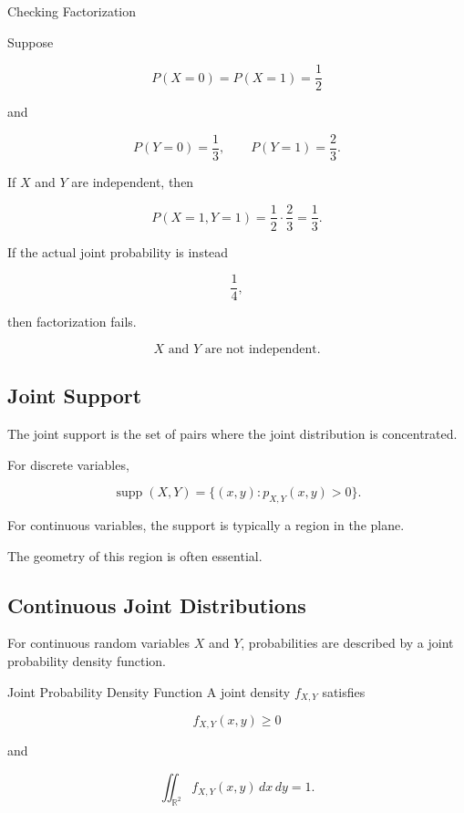 \begin{workedexamplebox}{Checking Factorization}

Suppose

\[
P(X=0)=P(X=1)=\frac12
\]

and

\[
P(Y=0)=\frac13,
\qquad
P(Y=1)=\frac23.
\]

If \(X\) and \(Y\) are independent, then

\[
P(X=1,Y=1)
=
\frac12\cdot\frac23
=
\frac13.
\]

If the actual joint probability is instead

\[
\frac14,
\]

then factorization fails.

\begin{answerbox}
\[
\boxed{
X\text{ and }Y\text{ are not independent}.
}
\]
\end{answerbox}

\end{workedexamplebox}

\subsection{Joint Support}
\label{subsec:joint-support}

The joint support is the set of pairs where the joint distribution is
concentrated.

For discrete variables,

\[
\boxed{
\operatorname{supp}(X,Y)
=
\{
(x,y):
p_{X,Y}(x,y)>0
\}.
}
\]

For continuous variables, the support is typically a region in the
plane.

The geometry of this region is often essential.

\subsection{Continuous Joint Distributions}
\label{subsec:continuous-joint-distributions}

For continuous random variables \(X\) and \(Y\), probabilities are
described by a joint probability density function.

\begin{definitionbox}{Joint Probability Density Function}
A joint density \(f_{X,Y}\) satisfies

\[
\boxed{
f_{X,Y}(x,y)\geq0
}
\]

and

\[
\boxed{
\iint_{\mathbb{R}^2}
f_{X,Y}(x,y)\,dx\,dy
=
1.
}
\]
\end{definitionbox}


